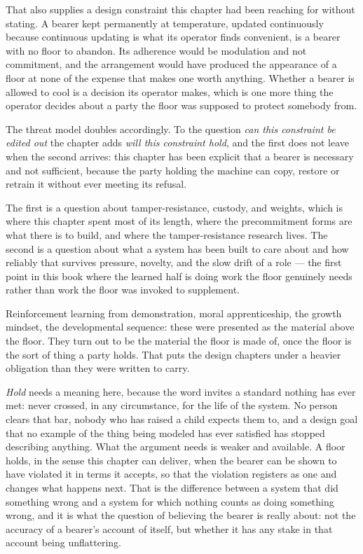 That also supplies a design constraint this chapter had been reaching for without stating. A bearer kept permanently at temperature, updated continuously because continuous updating is what its operator finds convenient, is a bearer with no floor to abandon. Its adherence would be modulation and not commitment, and the arrangement would have produced the appearance of a floor at none of the expense that makes one worth anything. Whether a bearer is allowed to cool is a decision its operator makes, which is one more thing the operator decides about a party the floor was supposed to protect somebody from.

The threat model doubles accordingly. To the question \emph{can this constraint be edited out} the chapter adds \emph{will this constraint hold}, and the first does not leave when the second arrives: this chapter has been explicit that a bearer is necessary and not sufficient, because the party holding the machine can copy, restore or retrain it without ever meeting its refusal.

The first is a question about tamper-resistance, custody, and weights, which is where this chapter spent most of its length, where the precommitment forms are what there is to build, and where the tamper-resistance research lives. The second is a question about what a system has been built to care about and how reliably that survives pressure, novelty, and the slow drift of a role — the first point in this book where the learned half is doing work the floor genuinely needs rather than work the floor was invoked to supplement.

Reinforcement learning from demonstration, moral apprenticeship, the growth mindset, the developmental sequence: these were presented as the material above the floor. They turn out to be the material the floor is made of, once the floor is the sort of thing a party holds. That puts the design chapters under a heavier obligation than they were written to carry.

\emph{Hold} needs a meaning here, because the word invites a standard nothing has ever met: never crossed, in any circumstance, for the life of the system. No person clears that bar, nobody who has raised a child expects them to, and a design goal that no example of the thing being modeled has ever satisfied has stopped describing anything. What the argument needs is weaker and available. A floor holds, in the sense this chapter can deliver, when the bearer can be shown to have violated it in terms it accepts, so that the violation registers as one and changes what happens next. That is the difference between a system that did something wrong and a system for which nothing counts as doing something wrong, and it is what the question of believing the bearer is really about: not the accuracy of a bearer's account of itself, but whether it has any stake in that account being unflattering.

